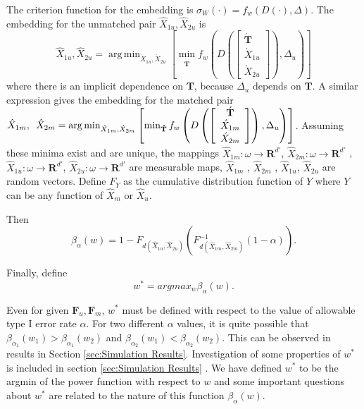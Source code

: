 \documentclass[11pt]{article} %
\DeclareMathOperator*{\argmin}{arg\,min}
\begin{document}
 The criterion function for the embedding is $\sigma_W(\cdot) =f_w(D({\cdot}),\Delta)$. The embedding for the unmatched pair ${\hat{X}_{1u},\hat{X}_{2u}}$  is 
 \[
{\hat{X}_{1u},\hat{X}_{2u}}
=\argmin_{\acute{X}_{1u}, \acute{X}_{2u}}\left[\min_{\mathbf{\acute{T}}}
{f_w\left(
D\left(
\left[
\begin{array}{c}
\acute{\mathbf{T}} \\
\acute{X}_{1u} \\
\acute{X}_{2u}
\end {array}
\right]
\right),
\Delta_{u}
\right)
}
\right]
\]
where there is an implicit dependence on $\mathbf{T}$, because $\Delta_{u}$ depends on $\mathbf{T}$. 
A similar expression gives the embedding for the matched pair  
${\hat{X}_{1m},\hspace{0.5em}\hat{X}_{2m}}=\argmin_{\acute{X}_{1m}, \acute{X}_{2m}}\left[\min_{\mathbf{\acute{T}}}
{f_w\left(
D\left(
\left[
\begin{array}{c}
\acute{\mathbf{T}} \\
\acute{X}_{1m} \\
\acute{X}_{2m}
\end {array}
\right]
\right),
\Delta_{u}
\right)
}
\right]$.
 Assuming these minima exist and are unique, the mappings $\hat{X}_{1m}:\omega\rightarrow \mathbf{R}^{d'}$,  $\hat{X}_{2m}:\omega\rightarrow \mathbf{R}^{d'}$ , $\hat{X}_{1u}:\omega\rightarrow \mathbf{R}^{d'}$, 
$\hat{X}_{2u}:\omega\rightarrow \mathbf{R}^{d'}$ are  measurable maps,  $\hat{X}_{1m}$ , $\hat{X}_{2m}$ , $\hat{X}_{1u}$, $\hat{X}_{2u}$ are random vectors. 
Define $F_Y$ as the   cumulative distribution function of  $Y$ where $Y$ can be  any function of $\hat{X}_m$ or $\hat{X}_u$.




 Then $$\beta_{\alpha}\left( w\right)=1-F_{d(\hat{X}_{1u},\hat{X}_{2u})}(F_{d(\hat{X}_{1m},\hat{X}_{2m})}^{-1}(1-\alpha)).$$

 Finally, define $$w^{*}=argmax_w{\beta_{\alpha}\left( w\right)}. $$


Even for  given $\mathbf{F}_u,\mathbf{F}_m$,   $w^*$ must be defined with respect to the value of allowable type I error rate $\alpha$.  For two different $\alpha$ values, it is quite possible that $\beta_{\alpha_1}(w_1)>\beta_{\alpha_1}(w_2)$  and $\beta_{\alpha_2}(w_1)<\beta_{\alpha_2}(w_2)$. This can be observed in results in Section \ref{sec:Simulation Results}.  
Investigation of some  properties of $w^{*}$  is included in section  \ref{sec:Simulation Results} .
We have defined $w^*$ to be the argmin of  the power function with respect to $w$ and some important questions about $w^*$ are  related to the nature of this function $\beta_{\alpha}\left( w\right)$.
\end{document}
